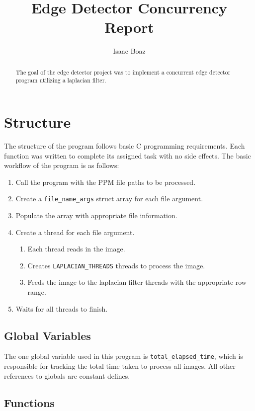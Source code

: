 \documentclass{article}
\title{Edge Detector Concurrency Report}
\author{Isaac Boaz}
\begin{document}
\maketitle

\begin{abstract}
    The goal of the edge detector project was to implement a concurrent edge
    detector program utilizing a laplacian filter.
\end{abstract}

\section{Structure}

The structure of the program follows basic C programming requirements.
Each function was written to complete its assigned task with no side effects.
The basic workflow of the program is as follows:
\begin{enumerate}
    \item Call the program with the PPM file paths to be processed.
    \item Create a \texttt{file\_name\_args} struct array for each file argument.
    \item Populate the array with appropriate file information.
    \item Create a thread for each file argument.
          \begin{enumerate}[label=4.\arabic*.]
              \item Each thread reads in the image.
              \item Creates \texttt{LAPLACIAN\_THREADS} threads to process the image.
              \item Feeds the image to the laplacian filter threads with the appropriate
                    row range.
          \end{enumerate}
    \item Waits for all threads to finish.
\end{enumerate}

\subsection{Global Variables}

The one global variable used in this program is \texttt{total\_elapsed\_time},
which is responsible for tracking the total time taken to process all images.
All other references to globals are constant defines.

\subsection{Functions}
\end{document}
